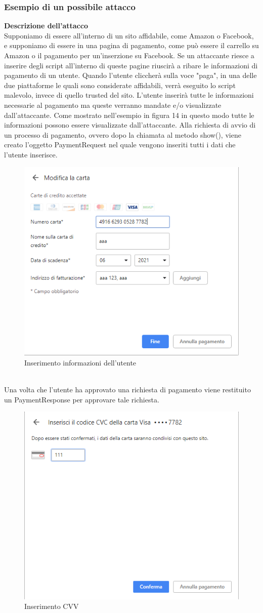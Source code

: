 \documentclass[11pt ,a4paper , twoside , openright ]{article}
\begin{document}
\subsubsection{Esempio di un possibile attacco \cite{rif18}} 
\textbf{Descrizione dell'attacco}
\\
Supponiamo di essere all'interno di un sito affidabile, come Amazon o Facebook, e supponiamo di essere in una pagina di pagamento, come può essere il carrello su Amazon o il pagamento per un'inserzione su Facebook.
Se un attaccante riesce a inserire degli script all'interno di queste pagine riuscirà a ribare le informazioni di pagamento di un utente.
Quando l'utente cliccherà sulla voce "paga", in una delle due piattaforme le quali sono considerate affidabili, verrà eseguito lo script malevolo, invece di quello trusted del sito.
L'utente inserirà tutte le informazioni necessarie al pagamento ma queste verranno mandate e/o visualizzate dall'attaccante.
Come mostrato nell'esempio in figura 14 in questo modo tutte le informazioni possono essere visualizzate dall'attaccante.
Alla richiesta di avvio di un processo di pagamento, ovvero dopo la chiamata al metodo show(), viene creato l'oggetto PaymentRequest nel quale vengono inseriti tutti i dati che l'utente inserisce. 
\begin{figure}[h]
	\centering
	\includegraphics[width=0.5\linewidth]{Chrome1}
	\caption{Inserimento informazioni dell'utente}
	\label{fig: Inserimento informazioni dell'utente}
\end{figure}
\\
\pagebreak
Una volta che l'utente ha approvato una richiesta di pagamento viene restituito un PaymentResponse per approvare tale richiesta. 
\begin{figure}[h]
	\centering
	\includegraphics[width=0.5\linewidth]{Chrome2}
	\caption{Inserimento CVV}
	\label{fig: Inserimento CVV}
\end{figure}
\end{document}
